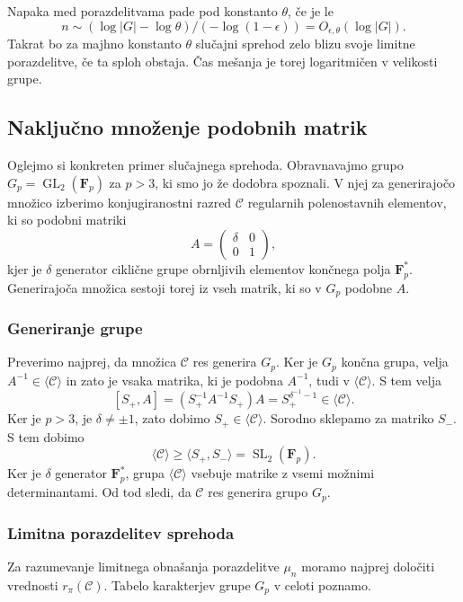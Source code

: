 \documentclass[11pt]{book}
\def\conclass{\mathcal{C}}
\def\FF{\mathbf{F}}
\DeclareMathOperator\GL{GL}
\DeclareMathOperator\SL{SL}
\theoremstyle{definition}
\theoremstyle{zgled}
\theoremstyle{zgledbrezstevilke}
\theoremstyle{odprtproblem}
\theoremstyle{domacanaloga}
\theoremstyle{izrek}
\begin{document}
Napaka med porazdelitvama pade pod konstanto $\theta$, če je le
\[
n \sim (\log |G| - \log \theta)/(- \log (1 - \epsilon)) = O_{\epsilon, \theta}(\log |G|).
\]
Takrat bo za majhno konstanto $\theta$ slučajni sprehod zelo blizu svoje limitne porazdelitve, če ta sploh obstaja. Čas mešanja je torej logaritmičen v velikosti grupe.

\subsection{Naključno množenje podobnih matrik}

Oglejmo si konkreten primer slučajnega sprehoda. Obravnavajmo grupo $G_p = \GL_2(\FF_p)$ za $p > 3$, ki smo jo že dodobra spoznali. V njej za generirajočo množico izberimo konjugiranostni razred $\conclass$ regularnih polenostavnih elementov, ki so podobni matriki
\[
    A = \begin{pmatrix}
        \delta & 0 \\ 0 & 1 
    \end{pmatrix},
\] 
kjer je $\delta$ generator ciklične grupe obrnljivih elementov končnega polja $\FF_p^*$. Generirajoča množica sestoji torej iz vseh matrik, ki so v $G_p$ podobne $A$.

\subsubsection{Generiranje grupe}

Preverimo najprej, da množica $\conclass$ res generira $G_p$. Ker je $G_p$ končna grupa, velja $A^{-1} \in \langle \conclass \rangle$ in zato je vsaka matrika, ki je podobna $A^{-1}$, tudi v $\langle \conclass \rangle$. S tem velja
\[
    [S_+, A] = (S_+^{-1} A^{-1} S_+) A  = S_+^{\delta^{-1} - 1}
    \in \langle \conclass \rangle.
\]
Ker je $p > 3$, je $\delta \neq \pm 1$, zato dobimo $S_+ \in \langle \conclass \rangle$. Sorodno sklepamo za matriko $S_-$. S tem dobimo
\[
    \textstyle \langle \conclass \rangle \geq \langle S_+, S_- \rangle = \SL_2(\FF_p).
\]
Ker je $\delta$ generator $\FF_p^*$, grupa $\langle \conclass \rangle$ vsebuje matrike z vsemi možnimi determinantami. Od tod sledi, da $\conclass$ res generira grupo $G_p$.

\subsubsection{Limitna porazdelitev sprehoda}

Za razumevanje limitnega obnašanja porazdelitve $\mu_n$ moramo najprej določiti vrednosti $r_{\pi}(\conclass)$. Tabelo karakterjev grupe $G_p$ v celoti poznamo.
\end{document}
